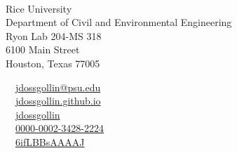 {\color{BrickRed}{\Large James Doss-Gollin}}\\[1em]

\begin{minipage}[t]{0.6\linewidth}
	\color{RiceGray}	
	Rice University\\
	Department of Civil and Environmental Engineering\\
	Ryon Lab 204-MS 318\\
	6100 Main Street\\
	Houston, Texas 77005\\
\end{minipage}
\hfill
\begin{minipage}[t]{0.3\linewidth}
	{
		\color{RiceGray}
		\raggedleft
		\faEnvelope~~\href{mailto:jdossgollin@psu.edu}{jdossgollin@psu.edu}                                   \\
		\faHome~~\href{https://jdossgollin.github.io}{jdossgollin.github.io}                                  \\
		\faGithub~~\href{https://github.com/jdossgollin}{jdossgollin}                                         \\
		{}~~\href{https://orcid.org/0000-0002-3428-2224}{0000-0002-3428-2224}                   \\
		{}~~\href{https://scholar.google.com/citations?user=6ifLBBsAAAAJ}{6ifLBBsAAAAJ}\\
	}                                                                                    
\end{minipage}\\[-2em]